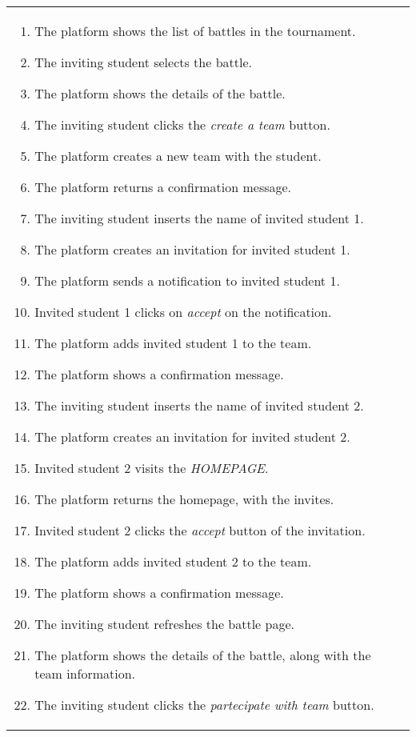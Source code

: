 \begin{enumerate}[label=\textbf{UC\arabic*}:,leftmargin=1.3cm]
\begin{table}[H]
\begin{tabular}{|l|p{11.9cm}|}
\begin{enumerate}[label=\arabic*.]
                      \item The platform shows the list of battles in the tournament.
                      \item The inviting student selects the battle.
                      \item The platform shows the details of the battle.
                      \item The inviting student clicks the \emph{create a team} button.
                      \item The platform creates a new team with the student.
                      \item The platform returns a confirmation message.
                      \item The inviting student inserts the name of invited student 1.
                      \item The platform creates an invitation for invited student 1.
                      \item The platform sends a notification to invited student 1.
                      \item Invited student 1 clicks on \emph{accept} on the notification.
                      \item The platform adds invited student 1 to the team.
                      \item The platform shows a confirmation message.
                      \item The inviting student inserts the name of invited student 2.
                      \item The platform creates an invitation for invited student 2.
                      \item Invited student 2 visits the \emph{HOMEPAGE}.
                      \item The platform returns the homepage, with the invites.
                      \item Invited student 2 clicks the \emph{accept} button of the invitation.
                      \item The platform adds invited student 2 to the team.
                      \item The platform shows a confirmation message.
                      \item The inviting student refreshes the battle page.
                      \item The platform shows the details of the battle, along with the team information.
                      \item The inviting student clicks the \emph{partecipate with team} button.

\end{enumerate}
\end{tabular}
\end{table}
\end{enumerate}
